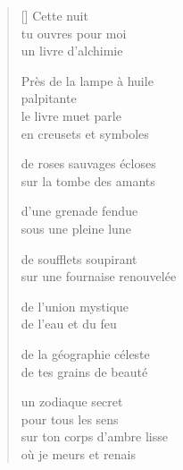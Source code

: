 \documentclass[12pt,a4paper]{article}
\begin{document}

\newpage

\poemtitle{}

\settowidth{\versewidth}{sur ton corps d'ambre lisse}

\bigskip

\begin{verse}[\versewidth]
  Cette nuit \\
  tu ouvres pour moi \\
  un livre d'alchimie

  Près de la lampe à huile \\
  palpitante \\
  le livre muet parle \\
  en creusets et symboles

  de roses sauvages écloses \\
  sur la tombe des amants

  d'une grenade fendue \\
  sous une pleine lune

  de soufflets soupirant \\
  sur une fournaise renouvelée

  de l'union mystique \\
  de l'eau et du feu

  de la géographie céleste \\
  de tes grains de beauté

  un zodiaque secret \\
  pour tous les sens \\
  sur ton corps d'ambre lisse \\
  où je meurs et renais
\end{verse}


\newpage

\poemtitle{}

\settowidth{\versewidth}{mon haleine faisant descendre un frisson}

\bigskip
\end{document}
